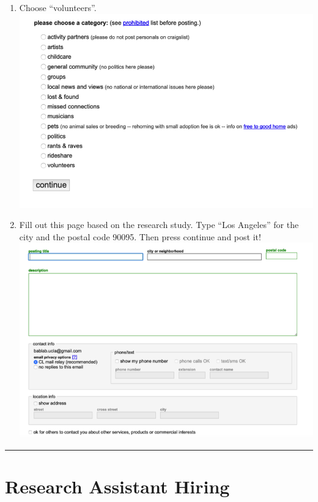 \documentclass[]{book}
\begin{document}
\begin{enumerate}
\item
  Choose ``volunteers''.
  \includegraphics{images/lab_protocols/craigslist/3.png}
\item
  Fill out this page based on the research study. Type ``Los Angeles'' for the city and the postal code 90095. Then press continue and post it!
  \includegraphics{images/lab_protocols/craigslist/4.png}
\end{enumerate}

\begin{center}\rule{0.5\linewidth}{0.5pt}\end{center}

\hypertarget{research-assistant-hiring}{%
\section{Research Assistant Hiring}\label{research-assistant-hiring}}
\end{document}
